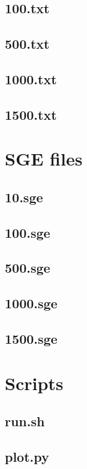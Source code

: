 \documentclass[11pt]{article}
\begin{document}
\subsection{100.txt}

\subsection{500.txt}

\subsection{1000.txt}

\subsection{1500.txt}


\section{SGE files}
\subsection{10.sge}

\subsection{100.sge}

\subsection{500.sge}

\subsection{1000.sge}

\subsection{1500.sge}


\section{Scripts}
\subsection{run.sh}

\subsection{plot.py}

\end{document}

